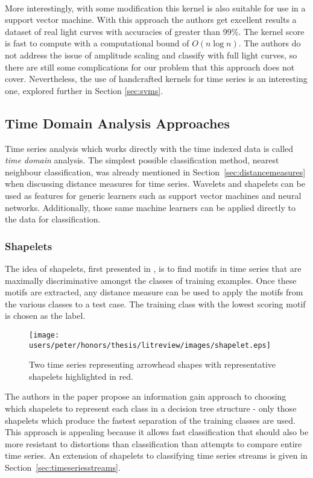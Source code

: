 	\paragraph{}
	More interestingly, with some modification this kernel is also suitable for use in a support vector machine. With this approach the authors get excellent results a dataset of real light curves with accuracies of greater than 99\%. The kernel score is fast to compute with a computational bound of $O(n\log n)$. The authors do not address the issue of amplitude scaling and classify with full light curves, so there are still some complications for our problem that this approach does not cover. Nevertheless, the use of handcrafted kernels for time series is an interesting one, explored further in Section \ref{sec:svms}.
	
	\subsection{Time Domain Analysis Approaches}
	Time series analysis which works directly with the time indexed data is called \emph{time domain} analysis. The simplest possible classification method, nearest neighbour classification, was already mentioned in Section~\ref{sec:distancemeasures} when discussing distance measures for time series. Wavelets and shapelets can be used as features for generic learners such as support vector machines and neural networks. Additionally, those same machine learners can be applied directly to the data for classification.

	\subsubsection{Shapelets}
	The idea of shapelets, first presented in \citep{ye2009time}, is to find motifs in time series that are maximally discriminative amongst the classes of training examples. Once these motifs are extracted, any distance measure can be used to apply the motifs from the various classes to a test case. The training class with the lowest scoring motif is chosen as the label.
	\begin{figure}[ht!]
	\centering
	\texttt{[image: users/peter/honors/thesis/litreview/images/shapelet.eps]}
	\caption{Two time series representing arrowhead shapes with representative shapelets highlighted in red.}
	\label{fig:shapelets}
	\end{figure}
	The authors in the paper propose an information gain approach to choosing which shapelets to represent each class in a decision tree structure - only those shapelets which produce the fastest separation of the training classes are used. This approach is appealing because it allows fast classification that should also be more resistant to distortions than classification than attempts to compare entire time series. An extension of shapelets to classifying time series streams is given in Section~\ref{sec:timeseriesstreams}.

